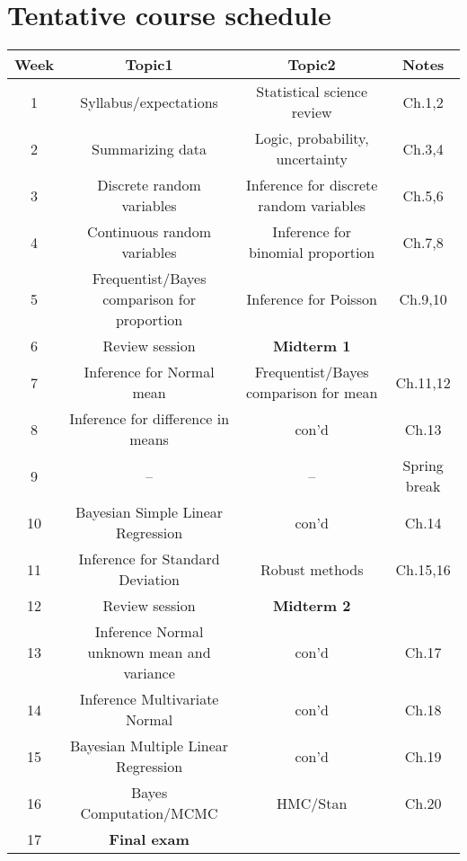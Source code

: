 \documentclass[11pt,onecolumn]{article}
\begin{document}

\section*{Tentative course schedule}
\begin{center}
  \begin{tabular}{|c|c|c|c|}
    \hline
    Week & Topic1 & Topic2 & Notes \\
    \hline
    1 & Syllabus/expectations & Statistical science review & Ch.1,2 \\
    \hline
    2 & Summarizing data & Logic, probability, uncertainty & Ch.3,4 \\
    \hline
    3 & Discrete random variables & Inference for discrete random variables & Ch.5,6 \\
    \hline
    4 & Continuous random variables & Inference for binomial proportion & Ch.7,8 \\
    \hline
    5 & Frequentist/Bayes comparison for proportion & Inference for Poisson & Ch.9,10 \\
    \hline
    6 & Review session & \textbf{Midterm 1} & \\
    \hline
    7 & Inference for Normal mean & Frequentist/Bayes comparison for mean & Ch.11,12 \\
    \hline
    8 & Inference for difference in means & con'd & Ch.13 \\
    \hline
    9 & -- & -- & Spring break  \\
    \hline
    10 & Bayesian Simple Linear Regression & con'd & Ch.14 \\
    \hline
    11 & Inference for Standard Deviation & Robust methods & Ch.15,16 \\
    \hline
    12 & Review session & \textbf{Midterm 2} & \\
    \hline
    13 & Inference Normal unknown mean and variance & con'd & Ch.17 \\
    \hline
    14 & Inference Multivariate Normal & con'd & Ch.18\\
    \hline
    15 & Bayesian Multiple Linear Regression & con'd & Ch.19\\
    \hline
    16 & Bayes Computation/MCMC & HMC/Stan & Ch.20 \\
    \hline
    17 & \textbf{Final exam} & & \\
    \hline
\end{tabular}
\end{center}
\end{document}
